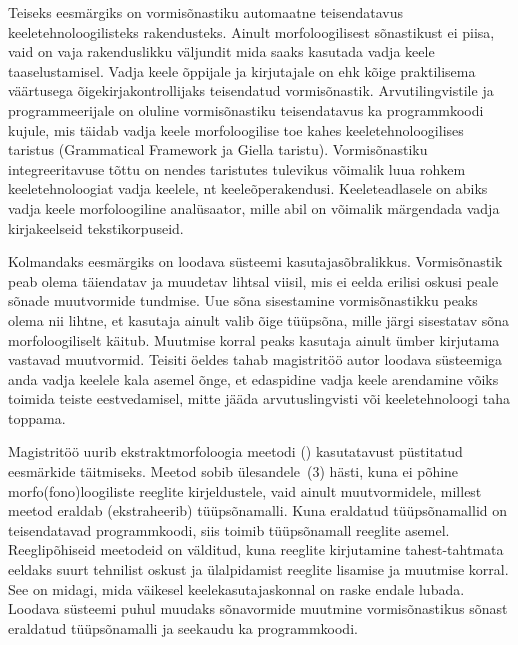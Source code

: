 \documentclass[12pt,a4paper]{article}
\begin{document}
Teiseks eesmärgiks on vormisõnastiku automaatne teisendatavus keele\-tehno\-loogilisteks rakendusteks. Ainult morfoloogilisest sõnastikust ei piisa, vaid on vaja rakenduslikku väljundit mida saaks kasutada vadja keele taas\-elustamisel.  Vadja keele õppijale ja kirjutajale on ehk kõige praktilisema väärtusega õigekirja\-kontrollijaks teisendatud vormi\-sõnastik. Arvuti\-lingvistile ja programmeerijale on oluline  vormi\-sõnastiku teisendatavus ka programm\-koodi kujule, mis täidab vadja keele morfoloogilise toe kahes keele\-tehnoloogilises taristus (Grammatical Framework ja Giella taristu). Vormi\-sõnastiku integreeritavuse tõttu on nendes taristutes tulevikus võimalik luua rohkem keeletehnoloogiat vadja keelele, nt keeleõpe\-rakendusi. Keele\-teadlasele on abiks vadja keele morfoloogiline analüsaator, mille abil on võimalik märgendada vadja kirja\-keelseid teksti\-korpuseid.

Kolmandaks eesmärgiks on loodava süsteemi kasutaja\-sõbralikkus. Vormi\-sõnastik peab olema täiendatav ja muudetav lihtsal viisil, mis ei eelda erilisi oskusi peale sõnade muut\-vormide tundmise. Uue sõna sisestamine vormi\-sõnastikku peaks olema nii lihtne, et kasutaja ainult valib õige tüüpsõna, mille järgi sisestatav sõna morfoloogiliselt käitub. Muutmise korral peaks kasutaja ainult ümber kirjutama vastavad muut\-vormid. Teisiti öeldes tahab magistritöö autor loodava süsteemiga anda vadja keelele kala asemel õnge,
et edaspidine vadja keele arendamine võiks toimida teiste eest\-vedamisel, mitte jääda arvutus\-lingvisti või keele\-tehnoloogi taha toppama.

Magistritöö uurib ekstrakt\-morfoloogia meetodi (\cite{ahlberg_semi-supervised_2014}) kasutatavust püstitatud eesmärkide täitmiseks. Meetod sobib ülesandele~(3) hästi, kuna ei põhine morfo(fono)loogiliste reeglite kirjeldustele, vaid ainult muut\-vormidele, millest meetod eraldab (ekstraheerib) tüüpsõna\-malli. Kuna eraldatud tüüpsõna\-mallid on teisendatavad programm\-koodi, siis toimib tüüp\-sõna\-mall reeglite asemel. %
Reegli\-põhiseid meetodeid on välditud, kuna reeglite kirjutamine tahest-tahtmata eeldaks suurt tehnilist oskust ja ülalpidamist reeglite lisamise ja muutmise korral. See on midagi, mida väikesel keele\-kasutajas\-konnal on raske endale lubada. Loodava süsteemi puhul muudaks sõnavormide muutmine vormisõnastikus sõnast eraldatud tüüpsõna\-malli ja seekaudu ka programm\-koodi.
\end{document}
